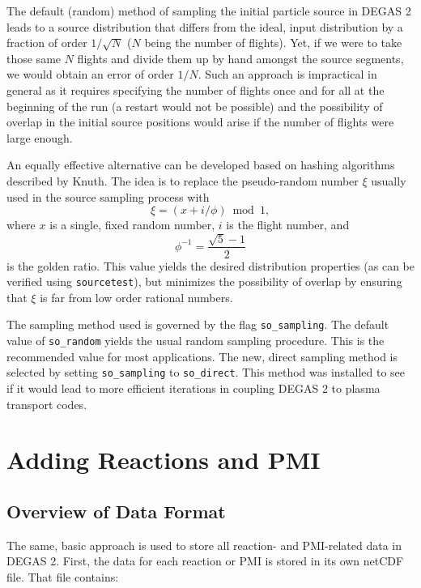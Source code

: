 \documentclass[12pt]{report}
\begin{document}
The default (random) method of sampling the initial particle source in
DEGAS 2 leads to a source distribution that differs from the ideal,
input distribution by a fraction of order $1/\sqrt{N}$ ($N$ being the
number of flights). Yet, if we were to take those same $N$ flights
and divide them up by hand amongst the source segments, we would 
obtain an error of order $1/N$. Such an approach is impractical in
general as it requires specifying the number of flights once and for
all at the beginning of the run (a restart would not be possible) and
the possibility of overlap in the initial source positions would arise
if the number of flights were large enough.

An equally effective alternative can be developed based on hashing
algorithms described by Knuth\cite{Knuth97}. The idea is to replace the
pseudo-random number $\xi$ usually used in the source sampling process with
\begin{equation}
\xi = (x + i / \phi) \bmod 1,
\end{equation}
where $x$ is a single, fixed random number, $i$ is the flight number,
and 
\begin{equation}
\phi^{-1} = \frac{\sqrt{5} - 1}{2}
\end{equation}
is the golden ratio. This value yields the desired distribution properties
(as can be verified using {\tt sourcetest}), but minimizes the possibility
of overlap by ensuring that $\xi$ is far from low order rational numbers.

The sampling method used is governed by the flag {\tt so\_sampling}. The
default value of {\tt so\_random} yields the usual random sampling procedure.
This is the recommended value for most applications. The new, direct 
sampling method is selected by setting {\tt so\_sampling} to 
{\tt so\_direct}. This method was installed to see if it would lead
to more efficient iterations in coupling DEGAS 2 to plasma transport
codes.

\section{Adding Reactions and PMI}
\label{addreactions}

\subsection{Overview of Data Format}

The same, basic approach is used to store all reaction- and PMI-related data
in DEGAS 2. First, the data for each reaction or PMI is stored in its own 
netCDF file. That file contains:
\end{document}
